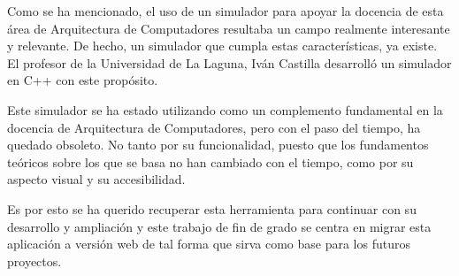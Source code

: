 Como se ha mencionado, el uso de un simulador para apoyar la docencia de esta área
de Arquitectura de Computadores resultaba un campo realmente interesante y relevante. 
De hecho, un simulador que cumpla estas características, ya existe. El profesor 
de la Universidad de La Laguna, Iván Castilla desarrolló un simulador en C++ con este propósito.

\bigskip
Este simulador se ha estado utilizando como un complemento fundamental en la docencia
de Arquitectura de Computadores, pero con el paso del tiempo, ha quedado obsoleto. 
No tanto por su funcionalidad, puesto que los fundamentos teóricos sobre los que 
se basa no han cambiado con el tiempo, como por su aspecto visual y su accesibilidad.

\bigskip
Es por esto se ha querido recuperar esta herramienta para continuar con su desarrollo 
y ampliación y este trabajo de fin de grado se centra en migrar esta aplicación a versión 
web de tal forma que sirva como base para los futuros proyectos.